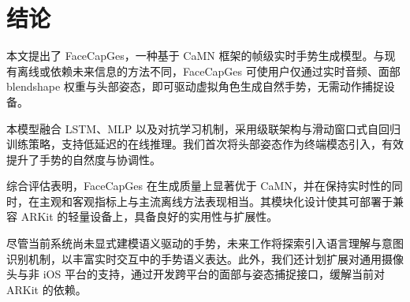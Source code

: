 
\chapter{结论}

本文提出了 FaceCapGes，一种基于 CaMN 框架的帧级实时手势生成模型。与现有离线或依赖未来信息的方法不同，FaceCapGes 可使用户仅通过实时音频、面部 blendshape 权重与头部姿态，即可驱动虚拟角色生成自然手势，无需动作捕捉设备。

本模型融合 LSTM、MLP 以及对抗学习机制，采用级联架构与滑动窗口式自回归训练策略，支持低延迟的在线推理。我们首次将头部姿态作为终端模态引入，有效提升了手势的自然度与协调性。

综合评估表明，FaceCapGes 在生成质量上显著优于 CaMN，并在保持实时性的同时，在主观和客观指标上与主流离线方法表现相当。其模块化设计使其可部署于兼容 ARKit 的轻量设备上，具备良好的实用性与扩展性。

尽管当前系统尚未显式建模语义驱动的手势，未来工作将探索引入语言理解与意图识别机制，以丰富实时交互中的手势语义表达。此外，我们还计划扩展对通用摄像头与非 iOS 平台的支持，通过开发跨平台的面部与姿态捕捉接口，缓解当前对 ARKit 的依赖。
